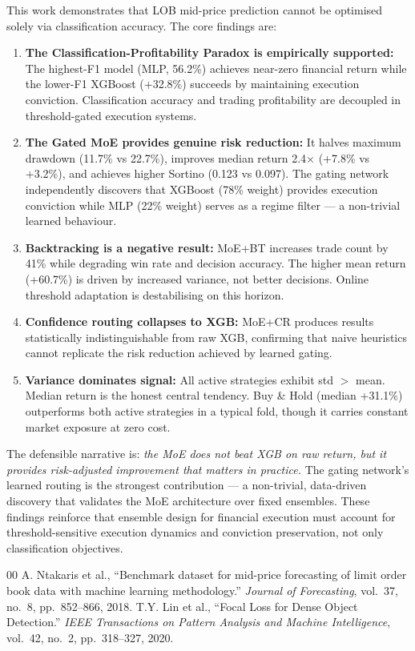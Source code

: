 \documentclass[conference]{IEEEtran}
\begin{document}
This work demonstrates that LOB mid-price prediction cannot be optimised
solely via classification accuracy. The core findings are:

\begin{enumerate}
    \item \textbf{The Classification-Profitability Paradox is empirically
    supported:} The highest-F1 model (MLP, 56.2\%) achieves near-zero
    financial return while the lower-F1 XGBoost (+32.8\%) succeeds by
    maintaining execution conviction. Classification accuracy and trading
    profitability are decoupled in threshold-gated execution systems.

    \item \textbf{The Gated MoE provides genuine risk reduction:} It halves
    maximum drawdown (11.7\% vs 22.7\%), improves median return 2.4$\times$
    (+7.8\% vs +3.2\%), and achieves higher Sortino (0.123 vs 0.097).
    The gating network independently discovers that XGBoost (78\% weight)
    provides execution conviction while MLP (22\% weight) serves as a
    regime filter --- a non-trivial learned behaviour.

    \item \textbf{Backtracking is a negative result:} MoE+BT increases
    trade count by 41\% while degrading win rate and decision accuracy.
    The higher mean return (+60.7\%) is driven by increased variance,
    not better decisions. Online threshold adaptation is destabilising on
    this horizon.

    \item \textbf{Confidence routing collapses to XGB:} MoE+CR produces
    results statistically indistinguishable from raw XGB, confirming that
    naive heuristics cannot replicate the risk reduction achieved by
    learned gating.

    \item \textbf{Variance dominates signal:} All active strategies exhibit
    std $>$ mean. Median return is the honest central tendency. Buy \& Hold
    (median +31.1\%) outperforms both active strategies in a typical fold,
    though it carries constant market exposure at zero cost.
\end{enumerate}

The defensible narrative is: \textit{the MoE does not beat XGB on raw
return, but it provides risk-adjusted improvement that matters in
practice.} The gating network's learned routing is the strongest
contribution --- a non-trivial, data-driven discovery that validates
the MoE architecture over fixed ensembles. These findings reinforce that
ensemble design for financial execution must account for
threshold-sensitive execution dynamics and conviction preservation,
not only classification objectives.

\begin{thebibliography}{00}
 A. Ntakaris et al., ``Benchmark dataset for mid-price
forecasting of limit order book data with machine learning methodology.''
\textit{Journal of Forecasting}, vol.~37, no.~8, pp.~852--866, 2018.
 T.Y. Lin et al., ``Focal Loss for Dense Object Detection.''
\textit{IEEE Transactions on Pattern Analysis and Machine Intelligence},
vol.~42, no.~2, pp.~318--327, 2020.
\end{thebibliography}
\end{document}
